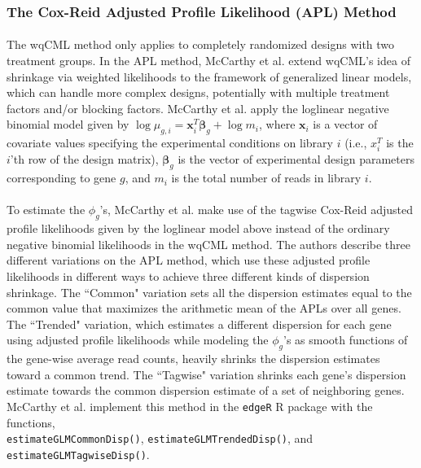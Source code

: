 \documentclass[10pt]{article}
\providecommand{\vc}[1]{\boldsymbol{#1}}
\begin{document}
\subsubsection*{The Cox-Reid Adjusted Profile Likelihood (APL) Method} \label{subsec:apl}

\paragraph{} \indent The wqCML method only applies to completely randomized designs with two treatment groups.
In the APL method, McCarthy et al. \cite{mcarthy} extend wqCML's idea of shrinkage via weighted likelihoods to the framework of generalized linear models, which can handle more complex designs, potentially with multiple treatment factors and/or blocking factors. McCarthy et al. \cite{mcarthy} apply the loglinear negative binomial model given by $\log \mu_{g, i} = \vc{x}_i^T \vc{\beta}_g + \log m_i$, where $\vc{x}_i$ is a vector of covariate values specifying the experimental conditions on library $i$ (i.e., $x_i^T$ is the $i$'th row of the design matrix), $\vc{\beta}_g$ is the vector of experimental design parameters corresponding to gene $g$, and $m_i$ is the total number of reads in library $i$.

\paragraph{} \indent To estimate the $\phi_g$'s, McCarthy et al. \cite{mcarthy} make use of the tagwise Cox-Reid adjusted profile likelihoods given by the loglinear model above instead of the ordinary negative binomial likelihoods in the wqCML method. The authors describe three different variations on the APL method, which use these adjusted profile likelihoods in different ways to achieve three different kinds of dispersion shrinkage. The ``Common" variation sets all the dispersion estimates equal to the common value that maximizes the arithmetic mean of the APLs over all genes. The ``Trended" variation, which estimates a different dispersion for each gene using adjusted profile likelihoods while modeling the $\phi_g$'s as smooth functions of the gene-wise average read counts, heavily shrinks the dispersion estimates toward a common trend. The ``Tagwise" variation shrinks each gene's dispersion estimate towards the common dispersion estimate of a set of neighboring genes. McCarthy et al. \cite{mcarthy} implement this method in the {\tt edgeR} R package with the functions, \\ {\tt estimateGLMCommonDisp()}, {\tt estimateGLMTrendedDisp()}, and {\tt estimateGLMTagwiseDisp()}.
\end{document}
